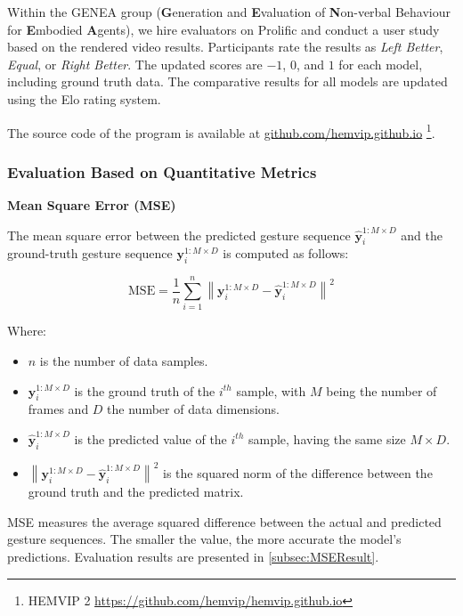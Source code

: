 Within the GENEA group (\textbf{G}eneration and \textbf{E}valuation of \textbf{N}on-verbal Behaviour for \textbf{E}mbodied \textbf{A}gents), we hire evaluators on Prolific and conduct a user study based on the rendered video results. Participants rate the results as \textit{Left Better}, \textit{Equal}, or \textit{Right Better}. The updated scores are $-1$, $0$, and $1$ for each model, including ground truth data. The comparative results for all models are updated using the Elo rating system.

The source code of the program is available at \hyperlink{https://github.com/hemvip/hemvip.github.io/}{github.com/hemvip.github.io}
\footnote{HEMVIP 2 \url{https://github.com/hemvip/hemvip.github.io}}.

\subsubsection{Evaluation Based on Quantitative Metrics}

\textbf{Mean Square Error (MSE)}

The mean square error between the predicted gesture sequence $\hat{\mathbf{y}}_i^{1:M \times D}$ and the ground-truth gesture sequence $\mathbf{y}_i^{1:M \times D}$ is computed as follows:

\begin{equation}
\text{MSE} = \frac{1}{n} \sum_{i=1}^n \left\| \mathbf{y}_i^{1:M \times D} - \hat{\mathbf{y}}_i^{1:M \times D} \right\|^2
\end{equation}

Where:
\begin{itemize}
	\item $n$ is the number of data samples.
	\item $\mathbf{y}_i^{1:M \times D}$ is the ground truth of the $i^{th}$ sample, with $M$ being the number of frames and $D$ the number of data dimensions.
	\item $\hat{\mathbf{y}}_i^{1:M \times D}$ is the predicted value of the $i^{th}$ sample, having the same size $M \times D$.
	\item $\left\| \mathbf{y}_i^{1:M \times D} - \hat{\mathbf{y}}_i^{1:M \times D} \right\|^2$ is the squared norm of the difference between the ground truth and the predicted matrix.
\end{itemize}

MSE measures the average squared difference between the actual and predicted gesture sequences. The smaller the value, the more accurate the model's predictions. Evaluation results are presented in \autoref{subsec:MSEResult}.

